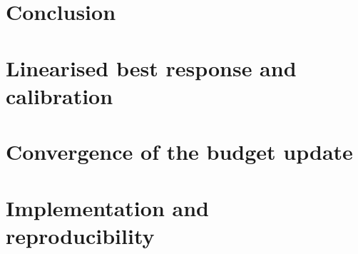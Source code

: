 \documentclass[11pt]{article}
\newif\ifshowguides
\newcommand{\guide}[1]{\ifshowguides
  \par\smallskip\noindent\fcolorbox{gray!50}{gray!6}{\parbox{\dimexpr\linewidth-2\fboxsep-2\fboxrule}{\small\itshape\color{gray!80!black}#1}}\par\smallskip\fi}
\newcommand{\E}{\mathbb{E}}
\newcommand{\Ups}{\Upsilon}
\begin{document}
\section{Conclusion}\label{sec:conclusion}
\guide{One paragraph with the headline numbers.}

\appendix
\section{Linearised best response and calibration}\label{app:derivation}
\guide{With $g=\nabla_x\ell$ and $D_{n,c}=b_{n,c}s_{n,c}$, H\"older gives
$\langle g_{n,c},D_{n,c}\rangle\le\|g_{n,c}\|_1 b_{n,c}$, attained at $s=\mathrm{sign}(g)$. Maximise
$\|g_{n,c}\|_1b-\lambda b^2$: $b^*=\|g_{n,c}\|_1/(2\lambda)$, value $\|g_{n,c}\|_1^2/(4\lambda)$. So
$\mathcal{V}^\lambda\approx\E\ell+\Ups^2/(4\lambda)$ and the realised radius is $\Ups/(2\lambda)$.
Consistency: in \eqref{eq:duality}, $\min_\lambda\{\lambda\delta^2+\Ups^2/(4\lambda)\}=\delta\Ups$ at
$\lambda=\Ups/(2\delta)$, recovering \cite{bartl2021}'s $\E\ell+\delta\Ups$. Include the numerical
verification (linear loss: objective $\Ups^2/(4\lambda)$, radius $\Ups/(2\lambda)$, random perturbations
never better).}

\section{Convergence of the budget update}\label{app:convergence}
\guide{Along a fixed sign profile let $\ell(b)=Gb-\tfrac{\mu}{2}b^2$. The update
$b\leftarrow(1-\kappa)b+\kappa(G-\mu b)/(2\lambda)$ has fixed point $G/(2\lambda+\mu)$ and factor
$1-\kappa(1+\mu/2\lambda)$: it converges iff $0<\kappa(1+\mu/2\lambda)<2$, i.e.\ (for $\kappa\le1$) iff
$\lambda>-\mu/2$. Below the threshold the objective is unbounded. Report the NumPy check.}

\section{Implementation and reproducibility}\label{app:impl}
\guide{Repository and commit hash; files added (\texttt{penalized.py}, \texttt{Heston\_train\_pen.py},
\texttt{calibrate\_lambda.py}, \texttt{evaluate.py}, \texttt{sensitivity.py}); authors' files unmodified;
attack in eval mode; threshold option; \texttt{--b\_max}; exact commands per table and figure; hardware
and run times. Note: the authors' attack always runs 20 iterations (its \texttt{iter} argument
only sets the step size).}
\end{document}
